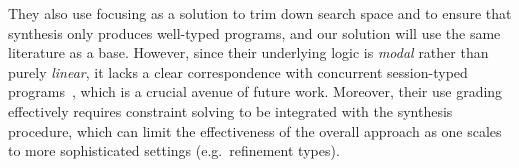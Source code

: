 \documentclass{llncs}
\newcommand{\lolli}{\multimap}
\newcommand{\tensor}{\otimes}
\newcommand{\one}{\mathbf{1}}
\newcommand{\bang}{{!}}
\begin{document}
They also use focusing as a solution to trim down search space and to
ensure that synthesis only produces well-typed programs, and our
solution will use the same literature as a base.  However, since their
underlying logic is \emph{modal} rather than purely \emph{linear}, it
lacks a clear correspondence with concurrent session-typed
programs~\cite{DBLP:journals/mscs/CairesPT16,DBLP:conf/concur/CairesP10},
which is a crucial avenue of future work. Moreover, their use grading
effectively requires constraint solving to be integrated with the
synthesis procedure, which can limit the effectiveness of the overall
approach as one scales to more sophisticated settings (e.g.~refinement
types).





\end{document}

